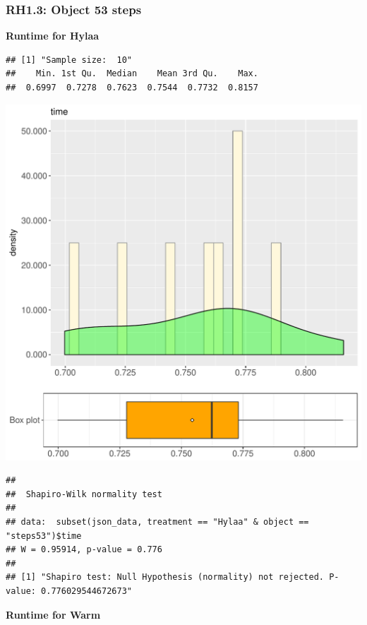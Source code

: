 \documentclass{article}\usepackage[]{graphicx}\usepackage[]{color}
\makeatletter
\def\maxwidth{ %
  \ifdim\Gin@nat@width>\linewidth
    \linewidth
  \else
    \Gin@nat@width
  \fi
}
\newenvironment{kframe}{%
 \def\at@end@of@kframe{}%
 \ifinner\ifhmode%
  \def\at@end@of@kframe{\end{minipage}}%
  \begin{minipage}{\columnwidth}%
 \fi\fi%
 \def\FrameCommand##1{\hskip\@totalleftmargin \hskip-\fboxsep
 \colorbox{shadecolor}{##1}\hskip-\fboxsep
     \hskip-\linewidth \hskip-\@totalleftmargin \hskip\columnwidth}%
 \MakeFramed {\advance\hsize-\width
   \@totalleftmargin\z@ \linewidth\hsize
   \@setminipage}}%
 {\par\unskip\endMakeFramed%
 \at@end@of@kframe}
\newenvironment{knitrout}{}{} %
\makeatother
\begin{document}
\subsubsection{RH1.3: Object 53 steps}

 \textbf{Runtime for Hylaa}
\begin{knitrout}
\color{fgcolor}\begin{kframe}
\begin{verbatim}
## [1] "Sample size:  10"
##    Min. 1st Qu.  Median    Mean 3rd Qu.    Max. 
##  0.6997  0.7278  0.7623  0.7544  0.7732  0.8157
\end{verbatim}
\end{kframe}
\includegraphics[width=\maxwidth]{figure/RH1_Hylaa_steps53-1} 
\begin{kframe}\begin{verbatim}
## 
## 	Shapiro-Wilk normality test
## 
## data:  subset(json_data, treatment == "Hylaa" & object == "steps53")$time
## W = 0.95914, p-value = 0.776
## 
## [1] "Shapiro test: Null Hypothesis (normality) not rejected. P-value: 0.776029544672673"
\end{verbatim}
\end{kframe}
\end{knitrout}
 \textbf{Runtime for Warm}
\end{document}
